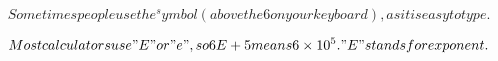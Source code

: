 






\[Sometimes people use the ^ symbol (above the 6 on your keyboard), as it is easy to type.\]

\[Most calculators use "E" or "e", so 6E+5 means 6 \times 10^{5}. "E" stands for exponent.\]
